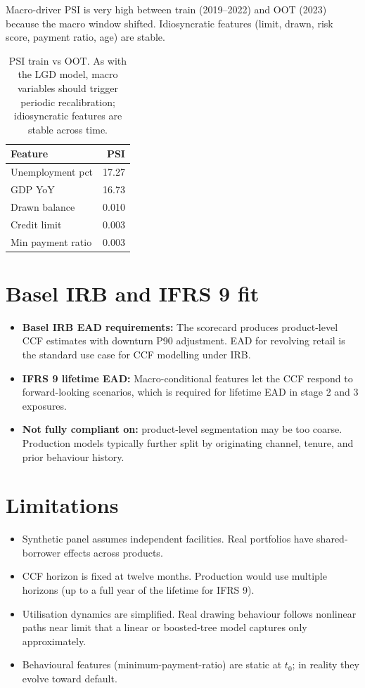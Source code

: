 \documentclass[a4paper,11pt]{article}
\begin{document}
Macro-driver PSI is very high between train (2019--2022) and OOT
(2023) because the macro window shifted. Idiosyncratic features
(limit, drawn, risk score, payment ratio, age) are stable.

\begin{table}[H]
\centering
\begin{tabular}{l r}
\toprule
\textbf{Feature} & \textbf{PSI} \\
\midrule
Unemployment pct     & 17.27 \\
GDP YoY              & 16.73 \\
Drawn balance        & 0.010 \\
Credit limit         & 0.003 \\
Min payment ratio    & 0.003 \\
\bottomrule
\end{tabular}
\caption{PSI train vs OOT. As with the LGD model, macro variables
should trigger periodic recalibration; idiosyncratic features are
stable across time.}
\end{table}

\section{Basel IRB and IFRS 9 fit}

\begin{itemize}
  \item \textbf{Basel IRB EAD requirements:} The scorecard produces
        product-level CCF estimates with downturn P90 adjustment. EAD
        for revolving retail is the standard use case for CCF
        modelling under IRB.
  \item \textbf{IFRS 9 lifetime EAD:} Macro-conditional features let
        the CCF respond to forward-looking scenarios, which is
        required for lifetime EAD in stage 2 and 3 exposures.
  \item \textbf{Not fully compliant on:} product-level segmentation
        may be too coarse. Production models typically further split
        by originating channel, tenure, and prior behaviour history.
\end{itemize}

\section{Limitations}

\begin{itemize}
  \item Synthetic panel assumes independent facilities. Real
        portfolios have shared-borrower effects across products.
  \item CCF horizon is fixed at twelve months. Production would use
        multiple horizons (up to a full year of the lifetime for
        IFRS 9).
  \item Utilisation dynamics are simplified. Real drawing behaviour
        follows nonlinear paths near limit that a linear or
        boosted-tree model captures only approximately.
  \item Behavioural features (minimum-payment-ratio) are static at
        $t_0$; in reality they evolve toward default.
\end{itemize}
\end{document}
